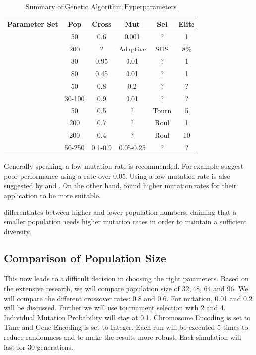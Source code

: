 \begin{table}[h]
	\centering
	\caption{Summary of Genetic Algorithm Hyperparameters}
	\label{tab:ga_hyperparameters}
	\begin{tabular}{|l|c|c|c|c|c|}
		\hline
		\textbf{Parameter Set} & \textbf{Pop} & \textbf{Cross} & \textbf{Mut} & \textbf{Sel} & \textbf{Elite} \\
		\hline
		\cite{de_jong_analysis_1975} & 50 & 0.6 & 0.001 & ? & 1 \\
		\hline
		\cite{mills_determining_2015} & 200 & ? & Adaptive & SUS & 8\% \\
		\hline
		\cite{grefenstette_optimization_1986} & 30 & 0.95 & 0.01 & ? & 1 \\
		\hline
		\cite{grefenstette_optimization_1986} & 80 & 0.45 & 0.01 & ? & 1 \\
		\hline
		\cite{almanee_scenorita_2021} & 50 & 0.8 & 0.2 & ? & ? \\
		\hline
		\cite{srinivas_genetic_1994}  & 30-100 & 0.9 & 0.01 & ? & ? \\
		\hline
		\cite{fazal_estimating_2005} & 50 & 0.5 & ? & Tourn & 5 \\
		\hline
		\cite{dao_maximising_2016} & 200 & 0.7 & ? & Roul & 1 \\
		\hline
		\cite{naruka_parameter_2019} & 200 & 0.4 & ? & Roul & 10 \\
		\hline
		\cite{jinghui_zhong_comparison_2005} & 50-250 & 0.1-0.9 & 0.05-0.25 & ? & ? \\
		\hline
	\end{tabular}
\end{table}

Generally speaking, a low mutation rate is recommended. For example \cite{grefenstette_optimization_1986} suggest poor performance using a rate over 0.05. Using a low mutation rate is also suggested by \cite{whitley_genetic_1994} and \cite{jinghui_zhong_comparison_2005}. On the other hand, \cite{boyabatli_parameter_2004} found higher mutation rates for their application to be more suitable.

\cite{srinivas_genetic_1994} differentiates between higher and lower population numbers, claiming that a smaller population needs higher mutation rates in order to maintain a sufficient diversity.


\subsection{Comparison of Population Size}
This now leads to a difficult decision in choosing the right parameters. Based on the extensive research, we will compare population size of 32, 48, 64 and 96. We will compare the different crossover rates: 0.8 and 0.6. For mutation, 0.01 and 0.2 will be discussed. Further we will use tournament selection with 2 and 4.
Individual Mutation Probability will stay at 0.1. Chromosome Encoding is set to Time and Gene Encoding is set to Integer. 
Each run will be executed 5 times to reduce randomness and to make the results more robust. Each simulation will last for 30 generations.

